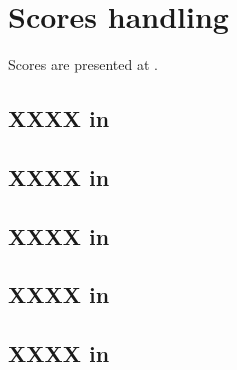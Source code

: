 



\chapter{Scores handling}

Scores are presented at .


\section{XXXX in \mxsrToMsr{}}


\section{XXXX in \mxsrToMsr{}}


\section{XXXX in \msrToMsr{}}


\section{XXXX in \msrToLpsr{}}


\section{XXXX in \lpsrToLilypond{}}


